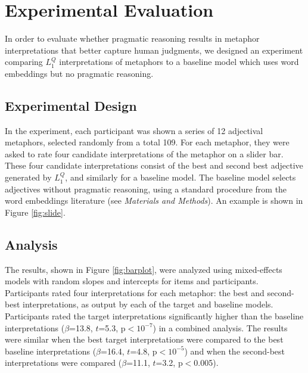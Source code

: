 \documentclass[9pt,twocolumn,twoside,lineno]{pnas-new}
\newcommand{\Listener}{L}
\newcommand{\QLONE}{\Listener_{{1}}^{{Q}}}
\begin{document}
\section{Experimental Evaluation} \label{exp}

	In order to evaluate whether pragmatic reasoning results in metaphor interpretations that better capture human judgments, we designed an experiment comparing $\QLONE$ interpretations of metaphors to a baseline model which uses word embeddings but no pragmatic reasoning.


	\subsection*{Experimental Design}

		In the experiment, each participant was shown a series of 12 adjectival metaphors, selected randomly from a total 109. For each metaphor, they were asked to rate four candidate interpretations of the metaphor on a slider bar. These four candidate interpretations consist of the best and second best adjective generated by $\QLONE$, and similarly for a baseline model. The baseline model selects adjectives without pragmatic reasoning, using a standard procedure from the word embeddings literature (see \emph{Materials and Methods}). An example is shown in Figure \ref{fig:slide}.


	
	

	\subsection*{Analysis}

		The results, shown in Figure \ref{fig:barplot}, were analyzed using mixed-effects models with random slopes and intercepts for items and participants. Participants rated four interpretations for each metaphor: the best and second-best interpretations, as output by each of the target and baseline models. Participants rated the target interpretations significantly higher than the baseline interpretations ($\beta$=13.8, $t$=5.3, p$<10^{-7}$) in a combined analysis. The results were similar when the best target interpretations were compared to the best baseline interpretations ($\beta$=16.4, $t$=4.8, p$<10^{-5}$) and when the second-best interpretations were compared ($\beta$=11.1, $t$=3.2, p$<$0.005).
\end{document}
